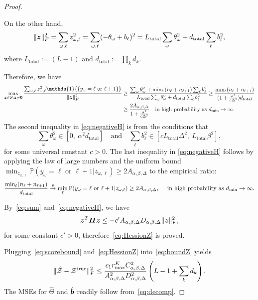 \documentclass{article}
\theoremstyle{plain}
\theoremstyle{definition}
\begin{document}
\begin{proof}
\begin{enumerate}
On the other hand,
\[
\lVert\bm{z}\rVert_F^2=\sum_{\omega,\ell}z^2_{\omega,\ell}=\sum_{\omega,\ell}(-\theta_\omega+b_\ell)^2=L_{\text{total}}\sum_{\omega}\theta^2_\omega+d_{\text{total}}\sum_\ell b^2_\ell,
\]
where $L_{\text{total}}:=(L-1)$ and $d_{\text{total}}:=\prod_k d_k$.

Therefore, we have
\begin{align}\label{eq:negativeH}
\max_{\mz\in\tS,\mz\neq \mathbf{0}}{\sum_{\omega,\ell} z^2_{\omega,\ell}\mathds{1}\{\{y_\omega=\ell \text{ or }\ell+1\}\} \over \FnormSize{}{\mz}^2}&\geq {\sum_{\omega}\theta^2_\omega+\min_\ell\left(n_{\ell}+n_{\ell+1}\right)\sum_{\ell}b_\ell^2\over L_{\text{total}} \sum_{\omega}\theta^2_\omega+d_{\text{total}}\sum_\ell b^2_\ell}
\geq{\min_{\ell}(n_\ell+n_{\ell+1})\over (1+{\alpha^2\over c\Delta^2})d_{\text{total}}}\notag\\
&\geq {2A_{\alpha,\beta,\Delta}\over 1+{\alpha^2\over c\Delta^2}}\quad \text{in high probability as $d_{\min}\to \infty$}. 
\end{align}
The second inequality in \eqref{eq:negativeH} is from the conditions that 
\[
\sum_{\omega}\theta_\omega^2\in [0,\ \alpha^2 d_{\text{total}}]\quad \text{and}\quad \sum_\ell b_\ell^2 \in[c L_{\text{total}}\Delta^2,\  L_{\text{total}}\beta^2],
\]
for some universal constant $c>0$. 
The last inequality in \eqref{eq:negativeH} follows by applying the law of large numbers and the uniform bound $\min_{z_{\omega,\ell}}\mathbb{P}(y_{\omega}=\ell \text{ or }\ell+1|z_{\omega,\ell})\geq 2A_{\alpha,\beta,\Delta}$ to the empirical ratio:
\[
{\min_{\ell}(n_\ell+n_{\ell+1})\over d_{\text{total}}}\overset{p}{\to}\min_{\ell} \mathbb{P}(y_{\omega}=\ell \text{ or }\ell+1|z_{\omega,\ell}) \geq 2A_{\alpha,\beta,\Delta}, \quad \text{ in high probability as $d_{\min}\to \infty$}.
\] 

By~\eqref{eq:sum} and~\eqref{eq:negativeH}, we have
\begin{equation}\label{eq:boundH}
\bm{z}^T\bm{H}\bm{z} \leq- c'A_{\alpha,\beta,\Delta}D_{\alpha,\beta,\Delta}\lVert\bm{z}\rVert_F^2,
\end{equation}
for some constant $c'>0$, therefore~\eqref{eq:HessionZ} is proved.
\end{enumerate}

 Plugging~\eqref{eq:scorebound} and~\eqref{eq:HessionZ} into~\eqref{eq:boundZ} yields
\[
\lVert\hat {\mathcal{Z}}-\mathcal{Z}^{\mathrm{true}}\rVert_F^2 \leq {c_1r^{K}_{\max}C^2_{\alpha,\beta,\Delta}\over A^2_{\alpha,\beta,\Delta}D^2_{\alpha,\beta,\Delta}}\left(L-1+\sum_k d_k\right).
\]
The MSEs for $\hat \Theta$ and $\hat {\bm{b}}$ readily follow from~\eqref{eq:decomp}. 

 
\end{proof}
\end{document}
